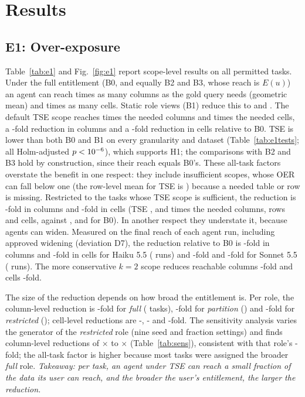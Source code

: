 \section{Results}
\label{sec:results}

\subsection{E1: Over-exposure}
\label{sec:res-exposure}
Table~\ref{tab:e1} and Fig.~\ref{fig:e1} report scope-level results on all \nTasks{} permitted tasks. Under the full
entitlement (B0, and equally B2 and B3, whose reach is $E(u)$) an agent can reach \oerColBzero{} times as many columns
as the gold query needs (geometric mean) and \oerCellBzero{} times as many cells. Static role views (B1) reduce this to
\oerColBone{} and \oerCellBone{}. The default TSE scope reaches \oerColTse{} times the needed columns and \oerCellTse{}
times the needed cells, a \oerColReduction-fold reduction in columns and a \oerCellReduction-fold reduction in cells
relative to B0. TSE is lower than both B0 and B1 on every granularity and dataset (Table~\ref{tab:e1tests}; all
Holm-adjusted $p<10^{-6}$), which supports H1; the comparisons with B2 and B3 hold by construction, since their
reach equals B0's. These all-task factors overstate the benefit in one respect:
they include insufficient scopes, whose OER can fall below one (the row-level mean for TSE is \oerRowTse) because a
needed table or row is missing. Restricted to the \nTseSuff{} tasks whose TSE scope is sufficient, the reduction is
\oerColReductionSuff-fold in columns and \oerCellReductionSuff-fold in cells (TSE \oerColTseSuff, \oerRowTseSuff{}
and \oerCellTseSuff{} times the needed columns, rows and cells, against \oerColBzeroSuff, \oerRowBzeroSuff{} and
\oerCellBzeroSuff{} for B0). In another respect they understate it, because agents can widen. Measured on the final
reach of each agent run, including approved widening (deviation D7), the reduction relative to B0 is
\oerColRedPostHaiku-fold in columns and \oerCellRedPostHaiku-fold in cells for Haiku 5.5 (\nPostHaiku{} runs) and
\oerColRedPostSonnet-fold and \oerCellRedPostSonnet-fold for Sonnet 5.5 (\nPostSonnet{} runs). The more conservative
$k{=}2$ scope reduces reachable columns \oerColReductionKtwo-fold and cells \oerCellReductionKtwo-fold.

The size of the reduction depends on how broad the entitlement is. Per role, the column-level reduction is
\oerColRedFull-fold for \emph{full} (\nRoleFull{} tasks), \oerColRedPartition-fold for \emph{partition}
(\nRolePartition) and \oerColRedRestricted-fold for \emph{restricted} (\nRoleRestricted); cell-level reductions are
\oerCellRedFull-, \oerCellRedPartition- and \oerCellRedRestricted-fold. The sensitivity analysis varies the generator
of the \emph{restricted} role (nine seed and fraction settings) and finds column-level reductions of
\sensRatioMin{}$\times$ to \sensRatioMax{}$\times$ (Table~\ref{tab:sens}), consistent with that role's
\oerColRedRestricted-fold; the all-task factor is higher because most tasks were assigned the broader \emph{full}
role. \emph{Takeaway: per task, an agent under TSE can reach a small fraction of the data its user can reach, and the
broader the user's entitlement, the larger the reduction.}

